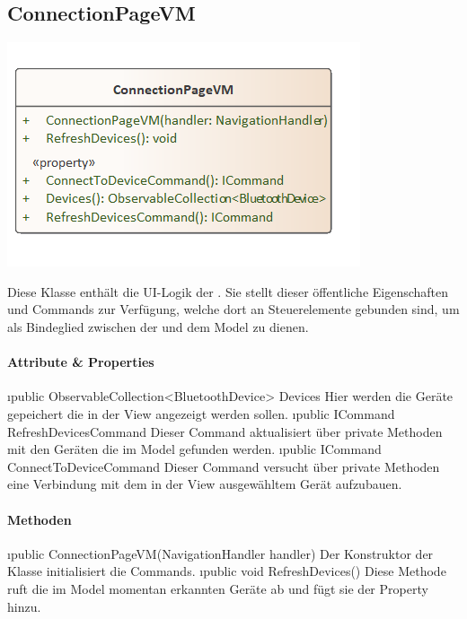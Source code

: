 \documentclass[../entwurf.tex]{subfiles}
\begin{document}
\subsection{ConnectionPageVM}
\begin{minipage}{0.5\textwidth}
\includegraphics[scale=0.75]{../graphics/vm_klassen/ConnectionPageVM.png}
\end{minipage}
\begin{minipage}{0.5\textwidth}
Diese Klasse enthält die UI-Logik der . Sie stellt dieser öffentliche Eigenschaften und Commands zur Verfügung, welche dort an Steuerelemente gebunden sind, um als Bindeglied zwischen der  und dem Model zu dienen.
\end{minipage}
\paragraph{Attribute \& Properties}
\begin{itemize}
	\i{public ObservableCollection<BluetoothDevice> Devices} Hier werden die Geräte gepeichert die in der View angezeigt werden sollen. 
	\i{public ICommand RefreshDevicesCommand} Dieser Command aktualisiert über private Methoden  mit den Geräten die im Model gefunden werden. 
	\i{public ICommand ConnectToDeviceCommand} Dieser Command versucht über private Methoden eine Verbindung mit dem in der View ausgewähltem Gerät aufzubauen. 
\end{itemize}
\paragraph{Methoden}
\begin{itemize}
	\i{public ConnectionPageVM(NavigationHandler handler)} Der Konstruktor der Klasse initialisiert die Commands.
	\i{public void RefreshDevices()} Diese Methode ruft die im Model momentan erkannten Geräte ab und fügt sie der Property  hinzu.
\end{itemize}
\end{document}

